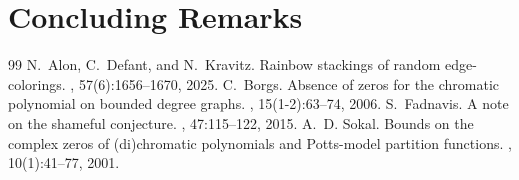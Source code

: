 \documentclass[10pt,a4paper]{amsart}
\begin{document}
\section{Concluding Remarks}\label{sec:conclusion}


\begin{thebibliography}{99}
 N.~Alon, C.~Defant, and N.~Kravitz. \newblock Rainbow stackings of random edge-colorings. , 57(6):1656--1670, 2025.
 C.~Borgs. \newblock Absence of zeros for the chromatic polynomial on bounded degree graphs. , 15(1-2):63--74, 2006.
 S.~Fadnavis. \newblock A note on the shameful conjecture. , 47:115--122, 2015.
 A.~D. Sokal. \newblock Bounds on the complex zeros of (di)chromatic polynomials and {P}otts-model partition functions. , 10(1):41--77, 2001.
\end{thebibliography}
\end{document}
